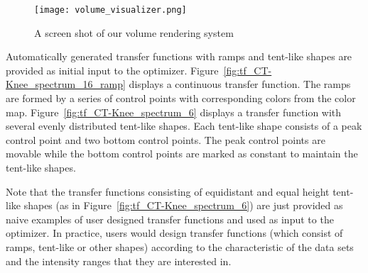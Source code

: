 \begin{figure}
    \centering
	\begin{minipage}{.48\textwidth}
        \centering
        \texttt{[image: volume\_visualizer.png]}
        \caption{A screen shot of our volume rendering system}
        \label{fig:volume_visualizer}
	\end{minipage}
\end{figure}

Automatically generated transfer functions with ramps and tent-like shapes are provided as initial input to the optimizer. Figure~\ref{fig:tf_CT-Knee_spectrum_16_ramp} displays a continuous transfer function. The ramps are formed by a series of control points with corresponding colors from the color map.
Figure~\ref{fig:tf_CT-Knee_spectrum_6} displays a transfer function with several evenly distributed tent-like shapes. Each tent-like shape consists of a peak control point and two bottom control points. The peak control points are movable while the bottom control points are marked as constant to maintain the tent-like shapes.

Note that the transfer functions consisting of equidistant and equal height tent-like shapes (as in Figure~\ref{fig:tf_CT-Knee_spectrum_6}) are just provided as naive examples of user designed transfer functions and used as input to the optimizer. In practice, users would design transfer functions (which consist of ramps, tent-like or other shapes) according to the characteristic of the data sets and the intensity ranges that they are interested in.


